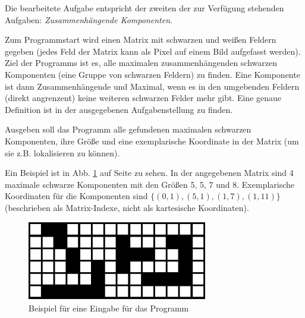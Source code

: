 Die bearbeitete Aufgabe entspricht der zweiten der zur Verfügung stehenden Aufgaben: \textit{Zusammenhängende Komponenten}.

Zum Programmstart wird einen Matrix mit schwarzen und weißen Feldern gegeben (jedes Feld der Matrix kann als Pixel auf einem Bild aufgefasst werden). Ziel der Programms ist es, alle maximalen zusammenhängenden schwarzen Komponenten (eine Gruppe von schwarzen Feldern) zu finden. Eine Komponente ist dann Zusammenhängende und Maximal, wenn es in den umgebenden Feldern (direkt angrenzent) keine weiteren schwarzen Felder mehr gibt. Eine genaue Definition ist in der ausgegebenen Aufgabenstellung zu finden.

Ausgeben soll das Programm alle gefundenen maximalen schwarzen Komponenten, ihre Größe und eine exemplarische Koordinate in der Matrix (um sie z.B. lokalisieren zu können).

Ein Beispiel ist in Abb. \ref{fig:inputbsp} auf Seite \pageref{fig:inputbsp} zu sehen. In der angegebenen Matrix sind 4 maximale schwarze Komponenten mit den Größen 5, 5, 7 und 8. Exemplarische Koordinaten für die Komponenten sind $\{(0, 1), (5, 1), (1, 7), (1, 11)\}$ (beschrieben als Matrix-Indexe, nicht als kartesische Koordinaten).

\begin{figure}[tbhp]
	\centering
	\includegraphics[width=0.7\textwidth]{images/inputbsp.eps}
	\caption{Beispiel für eine Eingabe für das Programm}
	\label{fig:inputbsp}
\end{figure}
